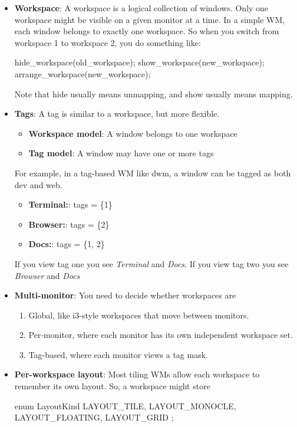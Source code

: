 \documentclass{report}
\begin{document}
    \pagebreak 
    \begin{itemize}
        \item \textbf{Workspace}: A workspace is a logical collection of windows. Only one workspace might be visible on a given monitor at a time. 
            \bigbreak \noindent 
            In a simple WM, each window belongs to exactly one workspace.
            \bigbreak \noindent 
            So when you switch from workspace 1 to workspace 2, you do something like:
            \bigbreak \noindent 
            \begin{cppcode}
                hide_workspace(old_workspace);
                show_workspace(new_workspace);
                arrange_workspace(new_workspace);
            \end{cppcode}
            \bigbreak \noindent 
            Note that hide usually means unmapping, and show usually means mapping.
        \item \textbf{Tags}: A tag is similar to a workspace, but more flexible.
            \begin{itemize}
                \item \textbf{Workspace model}: A window belongs to one workspace
                \item \textbf{Tag model}: A window may have one or more tags
            \end{itemize}
            For example, in a tag-based WM like dwm, a window can be tagged as both dev and web.
            \begin{itemize}
                \item \textbf{Terminal:}: tags = \{1\}
                \item \textbf{Browser:}:  tags = \{2\}
                \item \textbf{Docs:}:     tags = \{1, 2\}
            \end{itemize}
            If you view tag one you see \textit{Terminal} and \textit{Docs}. If you view tag two you see \textit{Browser} and \textit{Docs}
        \item \textbf{Multi-monitor}: You need to decide whether workspaces are
            \begin{enumerate}
                \item Global, like i3-style workspaces that move between monitors.
                \item Per-monitor, where each monitor has its own independent workspace set.
                \item Tag-based, where each monitor views a tag mask.
            \end{enumerate}
        \item \textbf{Per-workspace layout}: Most tiling WMs allow each workspace to remember its own layout. So, a workspace might store
            \bigbreak \noindent 
            \begin{cppcode}
                enum LayoutKind {
                    LAYOUT_TILE,
                    LAYOUT_MONOCLE,
                    LAYOUT_FLOATING,
                    LAYOUT_GRID
                };


\end{cppcode}
\end{itemize}
\end{document}
